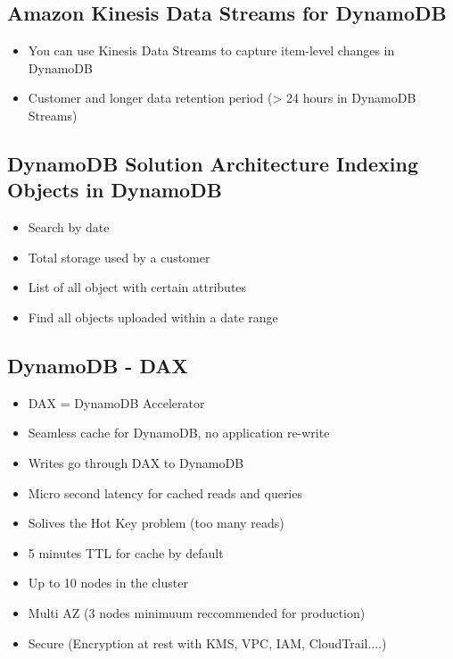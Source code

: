 \subsection{Amazon Kinesis Data Streams for DynamoDB}
\begin{itemize}
    \item You can use Kinesis Data Streams to capture item-level changes in DynamoDB
    \item Customer and longer data retention period (> 24 hours in DynamoDB Streams)
\end{itemize}

\subsection{DynamoDB Solution Architecture Indexing Objects in DynamoDB}
\begin{itemize}
    API for object metadata
    \item Search by date
    \item Total storage used by a customer
    \item List of all object with certain attributes
    \item Find all objects uploaded within a date range
\end{itemize}

\subsection{DynamoDB - DAX}
\begin{itemize}
    \item DAX = DynamoDB Accelerator
    \item Seamless cache for DynamoDB, no application re-write
    \item Writes go through DAX to DynamoDB
    \item Micro second latency for cached reads and queries
    \item Solives the Hot Key problem (too many reads)
    \item 5 minutes TTL for cache by default
    \item Up to 10 nodes in the cluster
    \item Multi AZ (3 nodes minimuum reccommended for production)
    \item Secure (Encryption at rest with KMS, VPC, IAM, CloudTrail....)
\end{itemize}

